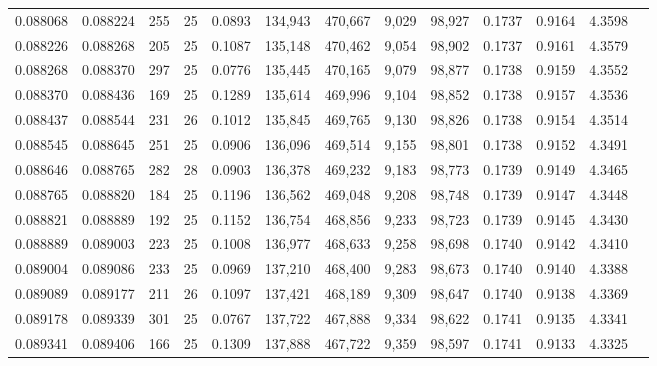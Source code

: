 \begin{tabular}{rrrrrrrrrrrrr}
0.088068 & 0.088224 & 255 &  25 &                                     0.0893 & 134,943 & 470,667 &   9,029 &  98,927 & 0.1737 & 0.9164 & 4.3598 \\
0.088226 & 0.088268 & 205 &  25 &                                     0.1087 & 135,148 & 470,462 &   9,054 &  98,902 & 0.1737 & 0.9161 & 4.3579 \\
0.088268 & 0.088370 & 297 &  25 &                                     0.0776 & 135,445 & 470,165 &   9,079 &  98,877 & 0.1738 & 0.9159 & 4.3552 \\
0.088370 & 0.088436 & 169 &  25 &                                     0.1289 & 135,614 & 469,996 &   9,104 &  98,852 & 0.1738 & 0.9157 & 4.3536 \\
0.088437 & 0.088544 & 231 &  26 &                                     0.1012 & 135,845 & 469,765 &   9,130 &  98,826 & 0.1738 & 0.9154 & 4.3514 \\
0.088545 & 0.088645 & 251 &  25 &                                     0.0906 & 136,096 & 469,514 &   9,155 &  98,801 & 0.1738 & 0.9152 & 4.3491 \\
0.088646 & 0.088765 & 282 &  28 &                                     0.0903 & 136,378 & 469,232 &   9,183 &  98,773 & 0.1739 & 0.9149 & 4.3465 \\
0.088765 & 0.088820 & 184 &  25 &                                     0.1196 & 136,562 & 469,048 &   9,208 &  98,748 & 0.1739 & 0.9147 & 4.3448 \\
0.088821 & 0.088889 & 192 &  25 &                                     0.1152 & 136,754 & 468,856 &   9,233 &  98,723 & 0.1739 & 0.9145 & 4.3430 \\
0.088889 & 0.089003 & 223 &  25 &                                     0.1008 & 136,977 & 468,633 &   9,258 &  98,698 & 0.1740 & 0.9142 & 4.3410 \\
0.089004 & 0.089086 & 233 &  25 &                                     0.0969 & 137,210 & 468,400 &   9,283 &  98,673 & 0.1740 & 0.9140 & 4.3388 \\
0.089089 & 0.089177 & 211 &  26 &                                     0.1097 & 137,421 & 468,189 &   9,309 &  98,647 & 0.1740 & 0.9138 & 4.3369 \\
0.089178 & 0.089339 & 301 &  25 &                                     0.0767 & 137,722 & 467,888 &   9,334 &  98,622 & 0.1741 & 0.9135 & 4.3341 \\
0.089341 & 0.089406 & 166 &  25 &                                     0.1309 & 137,888 & 467,722 &   9,359 &  98,597 & 0.1741 & 0.9133 & 4.3325 \\

\end{tabular}
